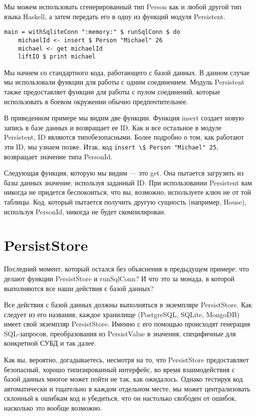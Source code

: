 Мы можем использовать сгенерированный тип Person как и любой другой тип языка Haskell, а затем передать его в одну из функций модуля Persistent.

\begin{lstlisting}
main = withSqliteConn ":memory:" $ runSqlConn $ do
    michaelId <- insert $ Person "Michael" 26
    michael <- get michaelId
    liftIO $ print michael
\end{lstlisting}%

Мы начнем со стандартного кода, работающего с базой данных. В данном случае мы использовали функции для работы с одним соединением. Модуль Persistent также предоставляет функции для работы с пулом соединений, которые использовать в боевом окружении обычно предпочтительнее.

В приведенном примере мы видим две функции. Функция insert создает новую запись в базе данных и возвращает ее ID. Как и все остальное в модуле Persistent, ID являются типобезопасными. Более подробно о том, как работают эти ID, мы узнаем позже. Итак, код \lstinline'insert \$ Person "Michael" 25', возвращает значение типа PersonId.

Следующая функция, которую мы видим --- это get. Она пытается загрузить из базы данных значение, используя заданный ID. При использовании Persistent вам никогда не придется беспокоиться, что вы, возможно, используете ключ не от той таблицы. Код, который пытается получить другую сущность (например, House), используя PersonId, никогда не будет скомпилирован.

\section{PersistStore}

Последний момент, который остался без объяснения в предыдущем примере: что делают функции PersistStore и runSqlConn? И что это за монада, в которой выполняются все наши действия с базой данных?

Все действия с базой данных должны выполняться в экземпляре PersistStore. Как следует из его названия, каждое хранилище (PostgreSQL, SQLite, MongoDB) имеет свой экземпляр PersistStore. Именно с его помощью происходят генерация SQL-запросов, преобразования из PersistValue в значения, специфичные для конкретной СУБД и так далее.

\begin{remark}
Как вы, вероятно, догадываетесь, несмотря на то, что PersistStore предоставляет безопасный, хорошо типизированный интерфейс, во время взаимодействия с базой данных многое может пойти не так, как ожидалось. Однако тестируя код автоматически и тщательно в каждом отдельном месте, мы может централизовать склонный к ошибкам код и убедиться, что он настолько свободен от ошибок, насколько это вообще возможно.
\end{remark}


